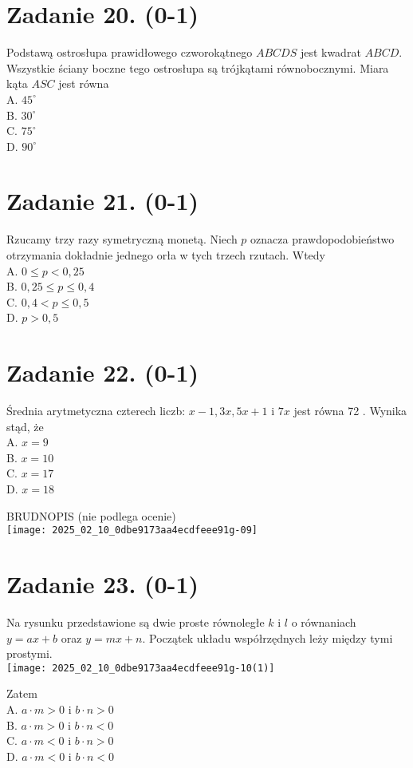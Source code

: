 \documentclass[10pt]{article}
\begin{document}
\section*{Zadanie 20. (0-1)}
Podstawą ostrosłupa prawidłowego czworokątnego \(A B C D S\) jest kwadrat \(A B C D\). Wszystkie ściany boczne tego ostrosłupa są trójkątami równobocznymi. Miara kąta \(A S C\) jest równa\\
A. \(45^{\circ}\)\\
B. \(30^{\circ}\)\\
C. \(75^{\circ}\)\\
D. \(90^{\circ}\)

\section*{Zadanie 21. (0-1)}
Rzucamy trzy razy symetryczną monetą. Niech \(p\) oznacza prawdopodobieństwo otrzymania dokładnie jednego orła w tych trzech rzutach. Wtedy\\
A. \(0 \leq p<0,25\)\\
B. \(0,25 \leq p \leq 0,4\)\\
C. \(0,4<p \leq 0,5\)\\
D. \(p>0,5\)

\section*{Zadanie 22. (0-1)}
Średnia arytmetyczna czterech liczb: \(x-1,3 x, 5 x+1\) i \(7 x\) jest równa 72 . Wynika stąd, że\\
A. \(x=9\)\\
B. \(x=10\)\\
C. \(x=17\)\\
D. \(x=18\)

BRUDNOPIS (nie podlega ocenie)\\
\texttt{[image: 2025\_02\_10\_0dbe9173aa4ecdfeee91g-09]}

\section*{Zadanie 23. (0-1)}
Na rysunku przedstawione są dwie proste równoległe \(k\) i \(l\) o równaniach \(y=a x+b\) oraz \(y=m x+n\). Początek układu współrzędnych leży między tymi prostymi.\\
\texttt{[image: 2025\_02\_10\_0dbe9173aa4ecdfeee91g-10(1)]}

Zatem\\
A. \(a \cdot m>0\) i \(b \cdot n>0\)\\
B. \(a \cdot m>0\) i \(b \cdot n<0\)\\
C. \(a \cdot m<0\) i \(b \cdot n>0\)\\
D. \(a \cdot m<0\) i \(b \cdot n<0\)
\end{document}
